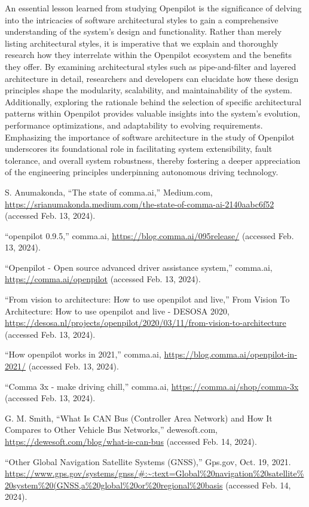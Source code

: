 \documentclass[12pt]{article}
\begin{document}
An essential lesson learned from studying Openpilot is the significance of delving into the intricacies of software architectural styles to gain a comprehensive understanding of the system's design and functionality. Rather than merely listing architectural styles, it is imperative that we explain and thoroughly research how they interrelate within the Openpilot ecosystem and the benefits they offer. By examining architectural styles such as pipe-and-filter and layered architecture in detail, researchers and developers can elucidate how these design principles shape the modularity, scalability, and maintainability of the system. Additionally, exploring the rationale behind the selection of specific architectural patterns within Openpilot provides valuable insights into the system's evolution, performance optimizations, and adaptability to evolving requirements. Emphasizing the importance of software architecture in the study of Openpilot underscores its foundational role in facilitating system extensibility, fault tolerance, and overall system robustness, thereby fostering a deeper appreciation of the engineering principles underpinning autonomous driving technology.


\begin{thebibliography}{00}

     S. Anumakonda, “The state of comma.ai,” Medium.com, \url{https://srianumakonda.medium.com/the-state-of-comma-ai-2140aabc6f52} (accessed Feb. 13, 2024).

     “openpilot 0.9.5,” comma.ai, \url{https://blog.comma.ai/095release/} (accessed Feb. 13, 2024).

     “Openpilot - Open source advanced driver assistance system,” comma.ai, \url{https://comma.ai/openpilot} (accessed Feb. 13, 2024).

     “From vision to architecture: How to use openpilot and live,” From Vision To Architecture: How to use openpilot and live - DESOSA 2020, \url{https://desosa.nl/projects/openpilot/2020/03/11/from-vision-to-architecture} (accessed Feb. 13, 2024).

     “How openpilot works in 2021,” comma.ai, \url{https://blog.comma.ai/openpilot-in-2021/} (accessed Feb. 13, 2024). 

     “Comma 3x - make driving chill,” comma.ai, \url{https://comma.ai/shop/comma-3x} (accessed Feb. 13, 2024). 

     G. M. Smith, “What Is CAN Bus (Controller Area Network) and How It Compares to Other Vehicle Bus Networks,” dewesoft.com,
    \url{https://dewesoft.com/blog/what-is-can-bus} (accessed Feb. 14, 2024).
    
     “Other Global Navigation Satellite Systems (GNSS),” Gps.gov, Oct. 19, 2021.
    \url{https://www.gps.gov/systems/gnss/#:~:text=Global%20navigation%20satellite%20system%20(GNSS,a%20global%20or%20regional%20basis} (accessed Feb. 14, 2024).
\end{thebibliography}
\end{document}
